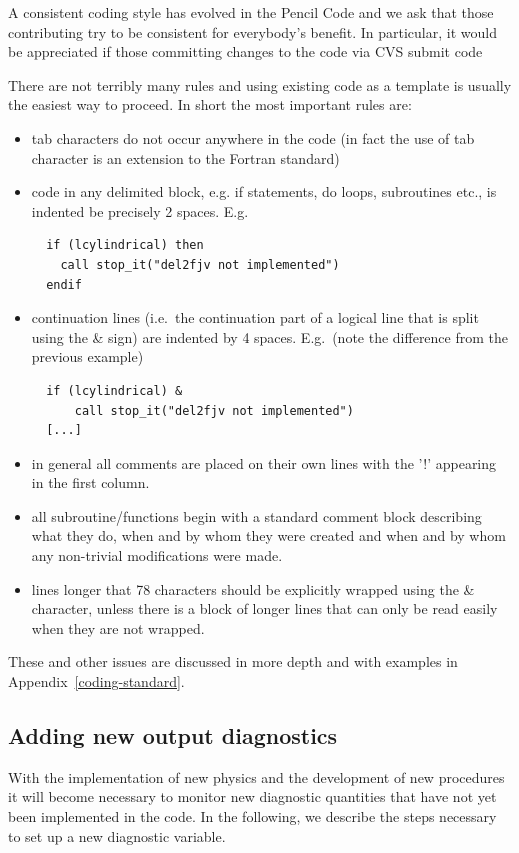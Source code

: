 \documentclass[\mydriver,12pt,twoside,notitlepage,a4paper]{article}
\begin{document}
A consistent coding style has evolved in the {\sc Pencil Code} and we
ask that those contributing try to be consistent for everybody's 
benefit.  In particular, it would be appreciated if those committing
changes to the code via CVS submit code

There are not terribly many rules and using existing code as a template
is usually the easiest way to proceed.  In short the most important rules are:
\begin{itemize}
\item tab characters do not occur anywhere in the code (in fact the use of
tab character is an extension to the Fortran standard)
\item code in any delimited block, e.g. if statements, do loops, subroutines 
etc., is indented be precisely 2 spaces.
E.g.
\begin{Verbatim}
  if (lcylindrical) then
    call stop_it("del2fjv not implemented")
  endif
\end{Verbatim}
\item continuation lines (i.e.~the continuation part of a logical line
  that is split using the \& sign) are indented by 4 spaces.
  E.g.~(note the difference from the previous example)
\begin{Verbatim}
  if (lcylindrical) &
      call stop_it("del2fjv not implemented")
  [...]
\end{Verbatim}
\item in general all comments are placed on their own lines with the '!' 
appearing in the first column. 
\item all subroutine/functions begin with a standard comment block describing
what they do, when and by whom they were created and when and by whom any
non-trivial modifications were made.
\item lines longer that 78 characters should be explicitly wrapped using
  the \& character, unless there is a block of longer lines that can only
  be read easily when they are not wrapped.
\end{itemize}

These and other issues are discussed in more depth and with examples in 
Appendix~\ref{coding-standard}.

\subsection{Adding new output diagnostics}

With the implementation of new physics and the development of new procedures
it will become necessary to monitor new diagnostic quantities that
have not yet been implemented in the code.
In the following, we describe the steps necessary to set up a new
diagnostic variable.
\end{document}
